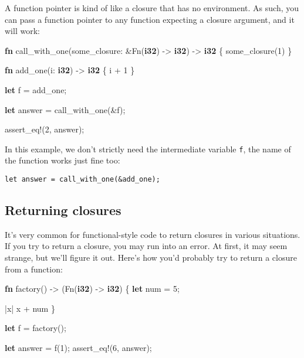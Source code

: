 \documentclass[a4paper,]{book}
\newenvironment{Shaded}{\begin{snugshade}}{\end{snugshade}}
\newcommand{\KeywordTok}[1]{\textcolor[rgb]{0.13,0.29,0.53}{\textbf{{#1}}}}
\newcommand{\DecValTok}[1]{\textcolor[rgb]{0.00,0.00,0.81}{{#1}}}
\newcommand{\OtherTok}[1]{\textcolor[rgb]{0.56,0.35,0.01}{{#1}}}
\newcommand{\NormalTok}[1]{{#1}}
\begin{document}
A function pointer is kind of like a closure that has no environment. As
such, you can pass a function pointer to any function expecting a
closure argument, and it will work:

\begin{Shaded}
\begin{Highlighting}[]
\KeywordTok{fn} \NormalTok{call_with_one(some_closure: &Fn(}\KeywordTok{i32}\NormalTok{) -> }\KeywordTok{i32}\NormalTok{) -> }\KeywordTok{i32} \NormalTok{\{}
    \NormalTok{some_closure(}\DecValTok{1}\NormalTok{)}
\NormalTok{\}}

\KeywordTok{fn} \NormalTok{add_one(i: }\KeywordTok{i32}\NormalTok{) -> }\KeywordTok{i32} \NormalTok{\{}
    \NormalTok{i + }\DecValTok{1}
\NormalTok{\}}

\KeywordTok{let} \NormalTok{f = add_one;}

\KeywordTok{let} \NormalTok{answer = call_with_one(&f);}

\OtherTok{assert_eq!}\NormalTok{(}\DecValTok{2}\NormalTok{, answer);}
\end{Highlighting}
\end{Shaded}

In this example, we don't strictly need the intermediate variable
\texttt{f}, the name of the function works just fine too:

\begin{verbatim}
let answer = call_with_one(&add_one);
\end{verbatim}

\subsection{Returning closures}\label{returning-closures}

It's very common for functional-style code to return closures in various
situations. If you try to return a closure, you may run into an error.
At first, it may seem strange, but we'll figure it out. Here's how you'd
probably try to return a closure from a function:

\begin{Shaded}
\begin{Highlighting}[]
\KeywordTok{fn} \NormalTok{factory() -> (Fn(}\KeywordTok{i32}\NormalTok{) -> }\KeywordTok{i32}\NormalTok{) \{}
    \KeywordTok{let} \NormalTok{num = }\DecValTok{5}\NormalTok{;}

    \NormalTok{|x| x + num}
\NormalTok{\}}

\KeywordTok{let} \NormalTok{f = factory();}

\KeywordTok{let} \NormalTok{answer = f(}\DecValTok{1}\NormalTok{);}
\OtherTok{assert_eq!}\NormalTok{(}\DecValTok{6}\NormalTok{, answer);}
\end{Highlighting}
\end{Shaded}
\end{document}

